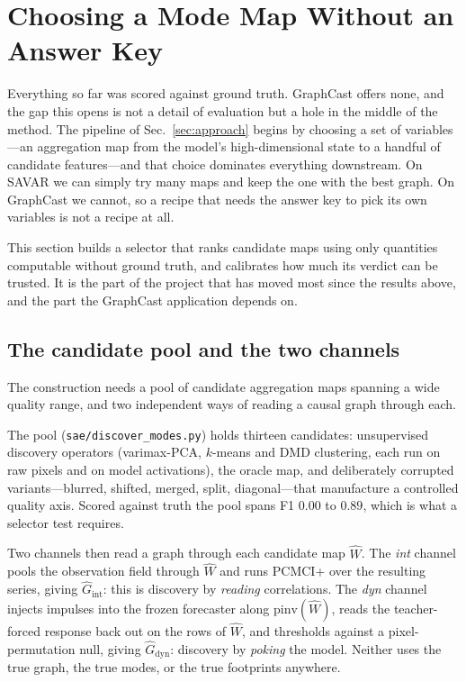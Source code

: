 \section{Choosing a Mode Map Without an Answer Key}
\label{sec:selector}

Everything so far was scored against ground truth. GraphCast offers none, and the
gap this opens is not a detail of evaluation but a hole in the middle of the
method. The pipeline of Sec.~\ref{sec:approach} begins by choosing a set of
variables---an aggregation map from the model's high-dimensional state to a
handful of candidate features---and that choice dominates everything downstream.
On SAVAR we can simply try many maps and keep the one with the best graph. On
GraphCast we cannot, so a recipe that needs the answer key to pick its own
variables is not a recipe at all.

This section builds a selector that ranks candidate maps using only quantities
computable without ground truth, and calibrates how much its verdict can be
trusted. It is the part of the project that has moved most since the results
above, and the part the GraphCast application depends on.

\subsection{The candidate pool and the two channels}
\label{sec:px}

The construction needs a pool of candidate aggregation maps spanning a wide
quality range, and two independent ways of reading a causal graph through each.

The pool (\texttt{sae/discover\_modes.py}) holds thirteen candidates: unsupervised
discovery operators (varimax-PCA, $k$-means and DMD clustering, each run on raw
pixels and on model activations), the oracle map, and deliberately corrupted
variants---blurred, shifted, merged, split, diagonal---that manufacture a
controlled quality axis. Scored against truth the pool spans F1 $0.00$ to $0.89$,
which is what a selector test requires.

Two channels then read a graph through each candidate map $\hat W$. The
\emph{int} channel pools the observation field through $\hat W$ and runs PCMCI+
over the resulting series, giving $\hat G_{\text{int}}$: this is discovery by
\emph{reading} correlations. The \emph{dyn} channel injects impulses into the
frozen forecaster along $\mathrm{pinv}(\hat W)$, reads the teacher-forced response
back out on the rows of $\hat W$, and thresholds against a pixel-permutation null,
giving $\hat G_{\text{dyn}}$: discovery by \emph{poking} the model. Neither uses
the true graph, the true modes, or the true footprints anywhere.

